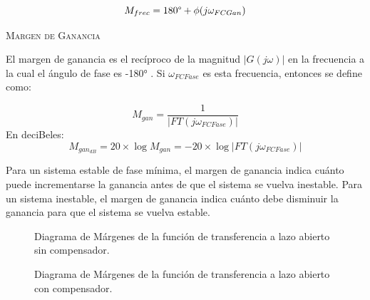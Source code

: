 \documentclass[a4paper,11pt]{article}
\begin{document}
$$M_{frec}=180\degree+\phi(j\omega_{FCGan})$$

\textsc{Margen de Ganancia}

El margen de ganancia es el recíproco de la magnitud $|G(j\omega)|$ en la frecuencia a la cual el ángulo de fase es -180° . Si $\omega_{FCFase}$ es esta frecuencia, entonces se define como:

$$M_{gan}=\frac{1}{|FT(j\omega_{FCFase})|}$$
En deciBeles:\\
$$M_{gan_{dB}}=20\times\log M_{gan}=-20\times\log|FT(j\omega_{FCFase})|$$

Para un sistema estable de fase mínima, el margen de ganancia indica cuánto puede incrementarse la ganancia antes de que el sistema se vuelva inestable. Para un sistema inestable, el margen de ganancia indica cuánto debe disminuir la ganancia para que el sistema se vuelva estable.

	\begin{figure}[H] %
	\caption{Diagrama de Márgenes de la función de transferencia a lazo abierto sin compensador.}
	\label{fig:bode2}
	\end{figure}
	
	\begin{figure}[H] %
	\caption{Diagrama de Márgenes de la función de transferencia a lazo abierto con compensador.}
	\label{fig:bode3}
	\end{figure}
	
\end{document}
